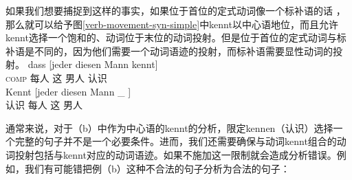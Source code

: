 如果我们想要捕捉到这样的事实，如果位于首位的定式动词像一个标补语的话 \citep{Hoehle97a}，那么就可以给予图\ref{verb-movement-syn-simple}中kennt以中心语地位，而且允许kennt选择一个饱和的、动词位于末位的动词投射。但是位于首位的定式动词与标补语是不同的，因为他们需要一个动词语迹的投射，而标补语需要显性动词的投射。
\eal
\ex 
\gll dass [jeder diesen Mann kennt]\\
     \textsc{comp} \spacebr{}每人 这 男人 认识\\
\ex 
\gll Kennt [jeder diesen Mann \_ ]\\
	 认识 \spacebr{}每人 这 男人\\
\zl

\noindent
通常来说，对于（b）中作为中心语的kennt的分析，限定kennen（认识）选择一个完整的句子并不是一个必要条件。进而，我们还需要确保与动词kennt组合的动词投射包括与kennt对应的动词语迹。如果不施加这一限制就会造成分析错误。例如，我们有可能错把例（b）这种不合法的句子分析为合法的句子：
\eal
{}
\zl


